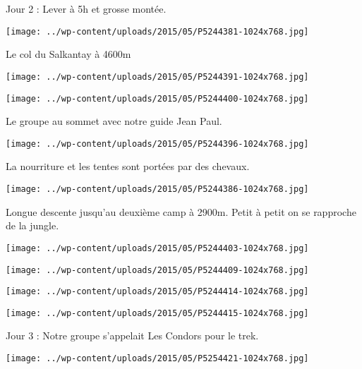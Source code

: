 Jour 2 : Lever à 5h et grosse montée. 
\begin{center} \texttt{[image: ../wp-content/uploads/2015/05/P5244381-1024x768.jpg]} \end{center}
\pagebreak

Le col du Salkantay à 4600m 
\begin{center} \texttt{[image: ../wp-content/uploads/2015/05/P5244391-1024x768.jpg]} \end{center}
\begin{center} \texttt{[image: ../wp-content/uploads/2015/05/P5244400-1024x768.jpg]} \end{center}
\pagebreak

Le groupe au sommet avec notre guide Jean Paul. 
\begin{center} \texttt{[image: ../wp-content/uploads/2015/05/P5244396-1024x768.jpg]} \end{center}

La nourriture et les tentes sont portées par des chevaux. 
\begin{center} \texttt{[image: ../wp-content/uploads/2015/05/P5244386-1024x768.jpg]} \end{center}
\pagebreak

Longue descente jusqu'au deuxième camp à 2900m. Petit à petit on se rapproche de la jungle. 
\begin{center} \texttt{[image: ../wp-content/uploads/2015/05/P5244403-1024x768.jpg]} \end{center}
\begin{center} \texttt{[image: ../wp-content/uploads/2015/05/P5244409-1024x768.jpg]} \end{center}

\begin{center} \texttt{[image: ../wp-content/uploads/2015/05/P5244414-1024x768.jpg]} \end{center}
\begin{center} \texttt{[image: ../wp-content/uploads/2015/05/P5244415-1024x768.jpg]} \end{center}
\pagebreak

Jour 3 : Notre groupe s'appelait \og Les Condors \fg pour le trek. 
\begin{center} \texttt{[image: ../wp-content/uploads/2015/05/P5254421-1024x768.jpg]} \end{center}

